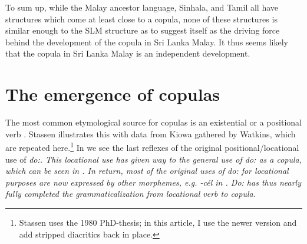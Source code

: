 \documentclass[a4paper,12pt]{article}
\begin{document}

To sum up, while the Malay ancestor language, Sinhala, and Tamil all have structures which come at least close to a copula, none of these structures is similar enough to the SLM structure as to suggest itself as the driving force behind the development of the copula in Sri Lanka Malay. It thus seems likely that the copula in Sri Lanka Malay is an independent development.

\section{The emergence of copulas}\label{sec:sources}
The most common etymological source for copulas is an existential \citep{Munro1977} or a positional verb \citep[94]{Stassen1997}. Stassen illustrates this with data from Kiowa gathered by Watkins, which are repeated here.\footnote{Stassen uses the 1980 PhD-thesis; in this article, I use the newer version \citep{Watkins1984} and add stripped diacritics   back in place.} In  we see the last reflexes of the original positional/locational use of \em do:\em. This locational use has given way to the general use of \em do: \em as a copula, which can be seen in . In return, most of the original uses of \em do:  \em for locational purposes are now expressed by other morphemes, e.g.  \em -cél \em in . \em Do: \em has thus nearly fully completed the grammaticalization from locational verb to copula.



\end{document}
